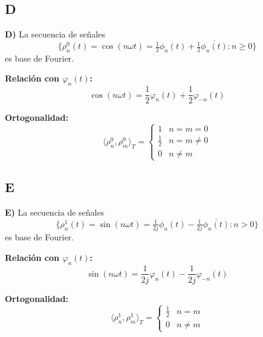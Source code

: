 \vspace{0.5cm}

\subsection{D}

\textbf{D)} La secuencia de señales \[\{ \rho_n^0(t) = \cos(n\omega t) = \tfrac{1}{2}\phi_n(t) + \tfrac{1}{2}\overline{\phi_n(t)} : n \geq 0 \}\] es base de Fourier.

\textbf{Relación con $\varphi_n(t)$:}
\[
\cos(n\omega t) = \frac{1}{2}\varphi_n(t) + \frac{1}{2}\varphi_{-n}(t)
\]

\textbf{Ortogonalidad:}
\[
\langle \rho_n^0, \rho_m^0 \rangle_T = 
\begin{cases}
1 & n = m = 0 \\
\frac{1}{2} & n = m \neq 0 \\
0 & n \neq m
\end{cases}
\]

\vspace{0.5cm}

\subsection{E}

\textbf{E)} La secuencia de señales \[\{ \rho_n^1(t) = \sin(n\omega t) = \tfrac{1}{2j}\phi_n(t) - \tfrac{1}{2j}\overline{\phi_n(t)} : n > 0 \}\] es base de Fourier.

\textbf{Relación con $\varphi_n(t)$:}
\[
\sin(n\omega t) = \frac{1}{2j}\varphi_n(t) - \frac{1}{2j}\varphi_{-n}(t)
\]

\textbf{Ortogonalidad:}
\[
\langle \rho_n^1, \rho_m^1 \rangle_T = 
\begin{cases}
\frac{1}{2} & n = m \\
0 & n \neq m
\end{cases}
\]
